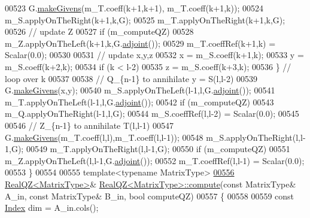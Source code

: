 \begin{DoxyCode}
00523         G.\hyperlink{group___jacobi___module_af73c81e9cc139b7e0d877ce553b02ec0}{makeGivens}(m\_T.coeff(k+1,k+1), m\_T.coeff(k+1,k));
00524         m\_S.applyOnTheRight(k+1,k,G);
00525         m\_T.applyOnTheRight(k+1,k,G);
00526         \textcolor{comment}{// update Z}
00527         \textcolor{keywordflow}{if} (m\_computeQZ)
00528           m\_Z.applyOnTheLeft(k+1,k,G.\hyperlink{group___jacobi___module_a89c8ea615f8fa77ddd5810a1e5fde4da}{adjoint}());
00529         m\_T.coeffRef(k+1,k) = Scalar(0.0);
00530 
00531         \textcolor{comment}{// update x,y,z}
00532         x = m\_S.coeff(k+1,k);
00533         y = m\_S.coeff(k+2,k);
00534         \textcolor{keywordflow}{if} (k < l-2)
00535           z = m\_S.coeff(k+3,k);
00536       \} \textcolor{comment}{// loop over k}
00537 
00538       \textcolor{comment}{// Q\_\{n-1\} to annihilate y = S(l,l-2)}
00539       G.\hyperlink{group___jacobi___module_af73c81e9cc139b7e0d877ce553b02ec0}{makeGivens}(x,y);
00540       m\_S.applyOnTheLeft(l-1,l,G.\hyperlink{group___jacobi___module_a89c8ea615f8fa77ddd5810a1e5fde4da}{adjoint}());
00541       m\_T.applyOnTheLeft(l-1,l,G.\hyperlink{group___jacobi___module_a89c8ea615f8fa77ddd5810a1e5fde4da}{adjoint}());
00542       \textcolor{keywordflow}{if} (m\_computeQZ)
00543         m\_Q.applyOnTheRight(l-1,l,G);
00544       m\_S.coeffRef(l,l-2) = Scalar(0.0);
00545 
00546       \textcolor{comment}{// Z\_\{n-1\} to annihilate T(l,l-1)}
00547       G.\hyperlink{group___jacobi___module_af73c81e9cc139b7e0d877ce553b02ec0}{makeGivens}(m\_T.coeff(l,l),m\_T.coeff(l,l-1));
00548       m\_S.applyOnTheRight(l,l-1,G);
00549       m\_T.applyOnTheRight(l,l-1,G);
00550       \textcolor{keywordflow}{if} (m\_computeQZ)
00551         m\_Z.applyOnTheLeft(l,l-1,G.\hyperlink{group___jacobi___module_a89c8ea615f8fa77ddd5810a1e5fde4da}{adjoint}());
00552       m\_T.coeffRef(l,l-1) = Scalar(0.0);
00553     \}
00554 
00555   \textcolor{keyword}{template}<\textcolor{keyword}{typename} MatrixType>
\hyperlink{group___eigenvalues___module_a2b6847964d9f1903193cc3e67c196849}{00556}     \hyperlink{group___eigenvalues___module}{RealQZ<MatrixType>}& \hyperlink{group___eigenvalues___module_a2b6847964d9f1903193cc3e67c196849}{RealQZ<MatrixType>::compute}(\textcolor{keyword}{const} 
      MatrixType& A\_in, \textcolor{keyword}{const} MatrixType& B\_in, \textcolor{keywordtype}{bool} computeQZ)
00557     \{
00558 
00559       \textcolor{keyword}{const} \hyperlink{group___eigenvalues___module_a6201e534e901b5f4e66f72c176b534a3}{Index} dim = A\_in.cols();

\end{DoxyCode}
